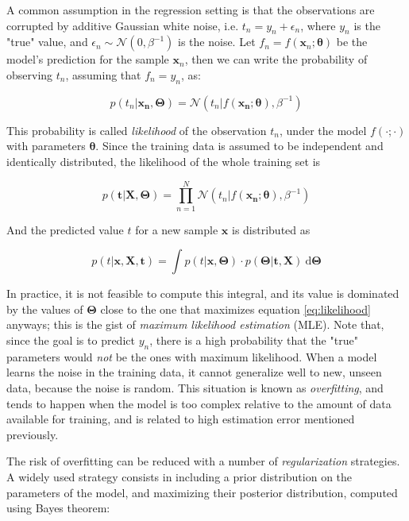 \documentclass[a4paper]{book}
\begin{document}
A common assumption in the regression setting is that the observations are corrupted by additive Gaussian white noise, i.e. $t_n=y_n+\epsilon_n$, where $y_n$ is the "true" value, and $\epsilon_n\sim\mathcal{N}(0,\beta^{-1})$ is the noise. Let $f_n=f(\bm x_n;\bm{\theta})$ be the model's prediction for the sample $\bm x_n$, then we can write the probability of observing $t_n$, assuming that $f_n=y_n$, as:

\begin{equation}
\label{eq:model_pred_distrib}
p(t_n\vert \bm{x_n},\bm\Theta)=\mathcal{N}(t_n\vert f(\bm{x_n};\bm\theta),\beta^{-1})
\end{equation}

This probability is called \emph{likelihood} of the observation $t_n$, under the model $f(\cdot;\cdot)$ with parameters $\bm{\theta}$. Since the training data is assumed to be independent and identically distributed, the likelihood of the whole training set is

\begin{equation}
\label{eq:likelihood}
p(\bm{t}\vert\bm{X}, \bm\Theta)=\prod_{n=1}^N  \mathcal{N}(t_n\vert f(\bm{x_n};\bm\theta),\beta^{-1})
\end{equation}

And the predicted value $t$ for a new sample $\bm x$ is distributed as

\begin{equation}
p(t\vert \bm x, \bm X, \bm t)=\int
p(t\vert\bm x,\bm\Theta)\cdot p(\bm\Theta\vert \bm t, \bm X)\ \text{d}\bm\Theta 
\end{equation}

In practice, it is not feasible to compute this integral, and its value is dominated by the values of $\bm\Theta$ close to the one that maximizes equation \ref{eq:likelihood} anyways; this is the gist of \emph{maximum likelihood estimation} (MLE). Note that, since the goal is to predict $y_n$, there is a high probability that the "true" parameters would \emph{not} be the ones with maximum likelihood. When a model learns the noise in the training data, it cannot generalize well to new, unseen data, because the noise is random. This situation is known as \emph{overfitting}, and tends to happen when the model is too complex relative to the amount of data available for training, and is related to high estimation error mentioned previously.

The risk of overfitting can be reduced with a number of \emph{regularization} strategies. A widely used strategy consists in including a prior distribution on the parameters of the model, and maximizing their posterior distribution, computed using Bayes theorem:
\end{document}
